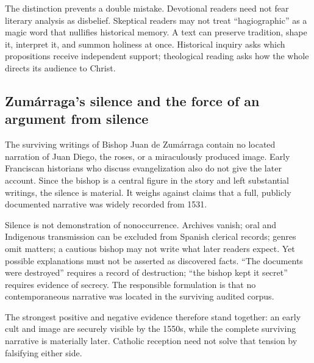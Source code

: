 The distinction prevents a double mistake. Devotional readers need not fear literary analysis as disbelief. Skeptical readers may not treat “hagiographic” as a magic word that nullifies historical memory. A text can preserve tradition, shape it, interpret it, and summon holiness at once. Historical inquiry asks which propositions receive independent support; theological reading asks how the whole directs its audience to Christ.

\subsection{Zumárraga's silence and the force of an argument from silence}

The surviving writings of Bishop Juan de Zumárraga contain no located narration of Juan Diego, the roses, or a miraculously produced image. Early Franciscan historians who discuss evangelization also do not give the later account. Since the bishop is a central figure in the story and left substantial writings, the silence is material. It weighs against claims that a full, publicly documented narrative was widely recorded from 1531.

Silence is not demonstration of nonoccurrence. Archives vanish; oral and Indigenous transmission can be excluded from Spanish clerical records; genres omit matters; a cautious bishop may not write what later readers expect. Yet possible explanations must not be asserted as discovered facts. “The documents were destroyed” requires a record of destruction; “the bishop kept it secret” requires evidence of secrecy. The responsible formulation is that no contemporaneous narrative was located in the surviving audited corpus.

The strongest positive and negative evidence therefore stand together: an early cult and image are securely visible by the 1550s, while the complete surviving narrative is materially later. Catholic reception need not solve that tension by falsifying either side.

